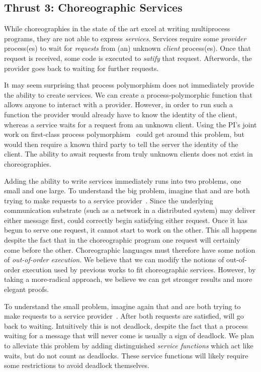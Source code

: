\subsection{Thrust 3: Choreographic Services}
\label{sec:t3}

While choreographies in the state of the art excel at writing multiprocess programs, they are not able to express \emph{services}.
Services require some \emph{provider} process(es) to wait for \emph{requests} from (an) unknown \emph{client} process(es).
Once that request is received, some code is executed to \emph{satify} that request.
Afterwords, the provider goes back to waiting for further requests.

It may seem surprising that process polymorphism does not immediately provide the ability to create services.
We can create a process-polymorphic function that allows anyone to interact with a provider.
However, in order to run such a function the provider would already have to know the identity of the client, whereas a service waits for a request from an unknown client.
Using the PI's joint work on first-class process polymorphism~\cite{SamuelsonHC25} could get around this problem, but would then require a known third party to tell the server the identity of the client.
The ability to await requests from truly unknown clients does not exist in choreographies.

Adding the ability to write services immediately runs into two problems, one small and one large.
To understand the big problem, imagine that \Alice{} and \Bob{} are both trying to make requests to a service provider~\Server.
Since the underlying communication substrate (such as a network in a distributed system) may deliver either message first, \Server{} could correctly begin satisfying either request.
Once it has begun to serve one request, it cannot start to work on the other.
This all happens despite the fact that in the choreographic program one request will certainly come before the other.
Choreographic languages must therefore have some notion of \emph{out-of-order execution}.
We believe that we can modify the notions of out-of-order execution used by previous works to fit choreographic services.
However, by taking a more-radical approach, we believe we can get stronger results and more elegant proofs.

To understand the small problem, imagine again that \Alice{} and \Bob{} are both trying to make requests to a service provider~\Server.
After both requests are satisfied, \Server{} will go back to waiting.
Intuitively this is not deadlock, despite the fact that a process waiting for a message that will never come is usually a sign of deadlock.
We plan to alleviate this problem by adding distinguished \emph{service functions} which act like waits, but do not count as deadlocks.
These service functions will likely require some restrictions to avoid deadlock themselves.

